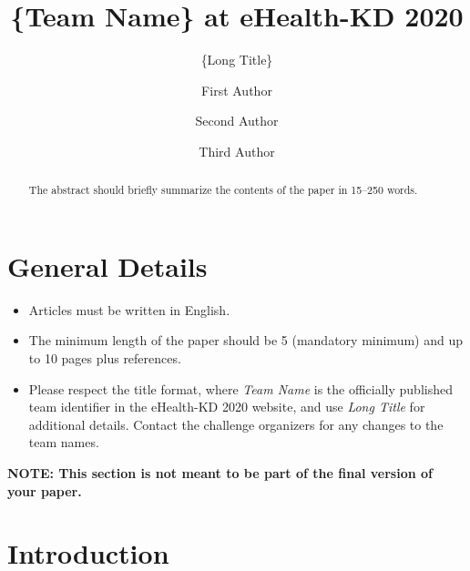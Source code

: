 \documentclass[]{llncs}
\begin{document}
%
\title{\{Team Name\} at eHealth-KD 2020}
\subtitle{\{Long Title\}}
%
%
\author{First Author \and
Second Author \and
Third Author}
%

%
%
\maketitle              %
%
\begin{abstract}
The abstract should briefly summarize the contents of the paper in
15--250 words.

\end{abstract}
%
%
%

\section*{General Details}

\begin{itemize}
    \item Articles must be written in English.
    \item The minimum length of the paper should be 5 (mandatory minimum) and up to 10 pages plus references.
    \item Please respect the title format, where \textit{Team Name} is the officially published team identifier in the eHealth-KD 2020 website, and use \textit{Long Title} for additional details. 
    Contact the challenge organizers for any changes to the team names.
\end{itemize}

\textbf{NOTE: This section is not meant to be part of the final version of your paper.}

\section{Introduction}
\end{document}
